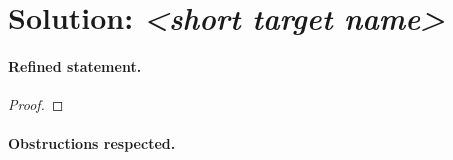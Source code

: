 \documentclass[../main.tex]{subfiles}
\begin{document}

\section*{Solution: \textit{<short target name>}}
\label{sec:sol-<id>}

\paragraph{Refined statement.}

\begin{theorem}
\label{thm:sol-<id>}
\end{theorem}

\begin{proof}
\end{proof}

\paragraph{Obstructions respected.}

\end{document}
